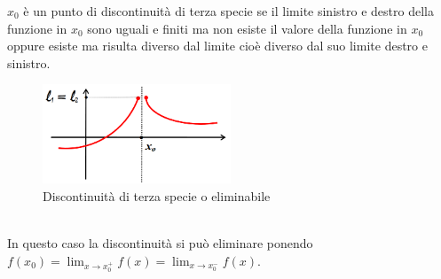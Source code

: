 \documentclass{article}
\begin{document}
$x_0$ è un punto di discontinuità di terza specie se il limite sinistro e destro della funzione in $x_0$ sono uguali e
finiti ma non esiste il valore della funzione in $x_0$ oppure esiste ma risulta diverso dal limite cioè diverso dal suo limite destro e sinistro.\\
\begin{figure}[h]
    \centering
    \includegraphics[width=0.5\textwidth]{discelim.png}
    \caption{Discontinuità di terza specie o eliminabile}
\end{figure}
\\In questo caso la discontinuità si può eliminare ponendo $f(x_0)=\lim_{x\to x_0^+}f(x)=\lim_{x \to x_0^-}f(x)$.
\end{document}

